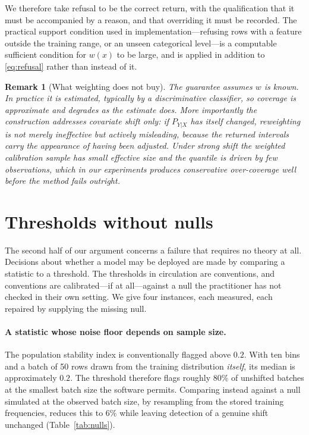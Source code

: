 \documentclass[11pt,a4paper]{article}
\newtheorem{remark}{Remark}
\theoremstyle{definition}
\begin{document}
We therefore take refusal to be the correct return, with the qualification that
it must be accompanied by a reason, and that overriding it must be recorded.
The practical support condition used in implementation---refusing rows with a
feature outside the training range, or an unseen categorical level---is a
computable sufficient condition for $w(x)$ to be large, and is applied
in addition to \eqref{eq:refusal} rather than instead of it.

\begin{remark}[What weighting does not buy]
The guarantee assumes $w$ is known. In practice it is estimated, typically by
a discriminative classifier, so coverage is approximate and degrades as the
estimate does. More importantly the construction addresses covariate shift
only: if $P_{Y|X}$ has itself changed, reweighting is not merely ineffective
but actively misleading, because the returned intervals carry the appearance
of having been adjusted. Under strong shift the weighted calibration sample
has small effective size and the quantile is driven by few observations, which
in our experiments produces conservative over-coverage well before the method
fails outright.
\end{remark}

\section{Thresholds without nulls}
\label{sec:thresholds}

The second half of our argument concerns a failure that requires no theory at
all. Decisions about whether a model may be deployed are made by comparing a
statistic to a threshold. The thresholds in circulation are conventions, and
conventions are calibrated---if at all---against a null the practitioner has
not checked in their own setting. We give four instances, each measured, each
repaired by supplying the missing null.

\paragraph{A statistic whose noise floor depends on sample size.} The
population stability index is conventionally flagged above $0.2$. With ten
bins and a batch of 50 rows drawn from the training distribution \emph{itself},
its median is approximately $0.2$. The threshold therefore flags roughly 80\%
of unshifted batches at the smallest batch size the software permits. Comparing
instead against a null simulated at the observed batch size, by resampling from
the stored training frequencies, reduces this to 6\% while leaving detection of
a genuine shift unchanged (Table~\ref{tab:nulls}).
\end{document}
